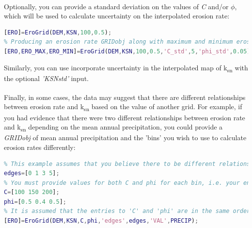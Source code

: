 \paragraph{}Optionally, you can provide a standard deviation on the values of \textit{C} and/or $\phi$, which will be used to calculate uncertainty on the interpolated erosion rate:

\begin{lstlisting}[language=Matlab]
% Producing a single erosion rate GRIDobj
[ERO]=EroGrid(DEM,KSN,100,0.5);
% Producing an erosion rate GRIDobj along with maximum and minimum erosion rate grids based on uncertainty in the C and phi values
[ERO,ERO_MAX,ERO_MIN]=EroGrid(DEM,KSN,100,0.5,'C_std',5,'phi_std',0.05);
\end{lstlisting}

\noindent Similarly, you can use incorporate uncertainty in the interpolated map of k\textsubscript{sn} with the optional \textit{'KSNstd'} input. 

\paragraph{}Finally, in some cases, the data may suggest that there are different relationships between erosion rate and k\textsubscript{sn} based on the value of another grid. For example, if you had evidence that there were two different relationships between erosion rate and k\textsubscript{sn} depending on the mean annual precipitation, you could provide a \textit{GRIDobj} of mean annual precipitation and the 'bins' you wish to use to calculate erosion rates differently:

\begin{lstlisting}[language=Matlab]
% Establish edges for bins you wish to apply to the GRIDobj of interest, in this case a grid of precipitation called PRECIP
% This example assumes that you believe there to be different relationship between erosion rate and ksn for areas that recieve 0-1 m/year, 1-3 m/yr, and 3-5 m/yr of precipitation per year
edges=[0 1 3 5];
% You must provide values for both C and phi for each bin, i.e. your entries for C and phi should have one fewer values than your entries to 'edges'
C=[100 150 200];
phi=[0.5 0.4 0.5];
% It is assumed that the entries to 'C' and 'phi' are in the same order as your bin edges, e.g. for any pixel with a precipitation value between 0 and 1 m/yr, a C of 100 and phi of 0.5 will be used to determine the erosion rate based on the ksn value at that pixel
[ERO]=EroGrid(DEM,KSN,C,phi,'edges',edges,'VAL',PRECIP);
\end{lstlisting}

